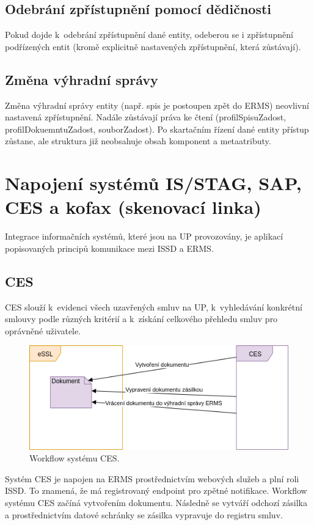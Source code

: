 \documentclass[
  master,
  field=ainfp,
  biblatex,
  language=czech,
  glossaries,
  theorems=false,
  index
]{kidiplom}
\begin{document}
\subsection{Odebrání zpřístupnění pomocí dědičnosti}
Pokud dojde k~odebrání zpřístupnění dané entity, odeberou se i zpřístupnění podřízených entit (kromě explicitně nastavených zpřístupnění, která zůstávají).

\subsection{Změna výhradní správy}
Změna výhradní správy entity (např. spis je postoupen zpět do ERMS) neovlivní nastavená zpřístupnění. Nadále zůstávají práva ke čtení (profilSpisuZadost, profilDokuemntuZadost, souborZadost). Po skartačním řízení dané entity přístup zůstane, ale struktura již neobsahuje obsah komponent a metaatributy.

\newpage
\section{Napojení systémů IS/STAG, SAP, CES a kofax (skenovací linka)}
Integrace informačních systémů, které jsou na UP provozovány, je aplikací popisovaných principů komunikace mezi ISSD a ERMS.

\subsection{CES}
\gls{CES} slouží k~evidenci všech uzavřených smluv na UP, k~vyhledávání konkrétní smlouvy podle různých kritérií a k~získání celkového přehledu smluv pro oprávněné uživatele.

\begin{figure}[h]
  \centerline{\includegraphics[width=0.9\linewidth]{./images/CESworkflow.png}} 
  \caption{Workflow systému CES.} 
\end{figure}

Systém CES je napojen na ERMS prostřednictvím webových služeb a plní roli ISSD. To znamená, že má registrovaný endpoint pro zpětné notifikace.
Workflow systému CES začíná vytvořením dokumentu. Následně se vytváří odchozí zásilka a prostřednictvím datové schránky se zásilka vypravuje do registru smluv.
\end{document}
